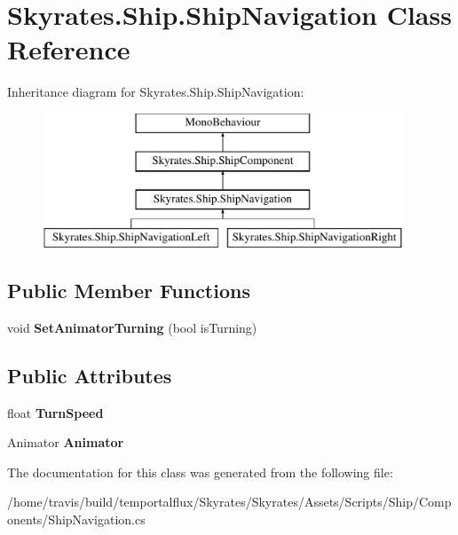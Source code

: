 \hypertarget{class_skyrates_1_1_ship_1_1_ship_navigation}{\section{Skyrates.\-Ship.\-Ship\-Navigation Class Reference}
\label{class_skyrates_1_1_ship_1_1_ship_navigation}
}
Inheritance diagram for Skyrates.\-Ship.\-Ship\-Navigation\-:\begin{figure}[H]
\begin{center}
\leavevmode
\includegraphics[height=4.000000cm]{class_skyrates_1_1_ship_1_1_ship_navigation}
\end{center}
\end{figure}
\subsection*{Public Member Functions}
\begin{DoxyCompactItemize}
\item 
\hypertarget{class_skyrates_1_1_ship_1_1_ship_navigation_aa7382c4603a78db40578e1f11c001958}{void {\bfseries Set\-Animator\-Turning} (bool is\-Turning)}\label{class_skyrates_1_1_ship_1_1_ship_navigation_aa7382c4603a78db40578e1f11c001958}

\end{DoxyCompactItemize}
\subsection*{Public Attributes}
\begin{DoxyCompactItemize}
\item 
\hypertarget{class_skyrates_1_1_ship_1_1_ship_navigation_acb5ff1cc10db00393253455a9546cab3}{float {\bfseries Turn\-Speed}}\label{class_skyrates_1_1_ship_1_1_ship_navigation_acb5ff1cc10db00393253455a9546cab3}

\item 
\hypertarget{class_skyrates_1_1_ship_1_1_ship_navigation_a054036bf58dbae0b9137190c012ce29b}{Animator {\bfseries Animator}}\label{class_skyrates_1_1_ship_1_1_ship_navigation_a054036bf58dbae0b9137190c012ce29b}

\end{DoxyCompactItemize}


The documentation for this class was generated from the following file\-:\begin{DoxyCompactItemize}
\item 
/home/travis/build/temportalflux/\-Skyrates/\-Skyrates/\-Assets/\-Scripts/\-Ship/\-Components/Ship\-Navigation.\-cs\end{DoxyCompactItemize}
